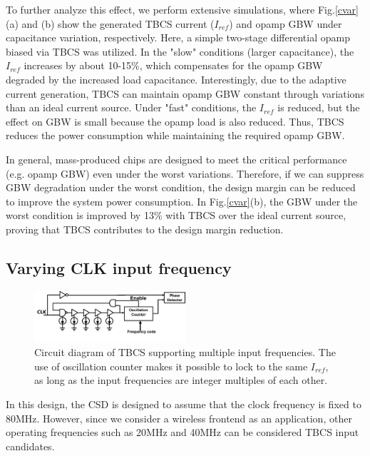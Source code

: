 \documentclass[paper]{ieice}
\begin{document}
To further analyze this effect, we perform extensive simulations, where Fig.\ref{cvar}(a) and (b) show the generated TBCS current ($I_{ref}$) and opamp GBW under capacitance variation, respectively. Here, a simple two-stage differential opamp biased via TBCS was utilized. In the "slow" conditions (larger capacitance), the $I_{ref}$ increases by about 10-15\%, which compensates for the opamp GBW degraded by the increased load capacitance. Interestingly, due to the adaptive current generation, TBCS can maintain opamp GBW constant through variations than an ideal current source. Under "fast" conditions, the $I_{ref}$ is reduced, but the effect on GBW is small because the opamp load is also reduced. Thus, TBCS reduces the power consumption while maintaining the required opamp GBW. 

In general, mass-produced chips are designed to meet the critical performance (e.g. opamp GBW) even under the worst variations. Therefore, if we can suppress GBW degradation under the worst condition, the design margin can be reduced to improve the system power consumption. In Fig.\ref{cvar}(b), the GBW under the worst condition is improved by 13\% with TBCS over the ideal current source, proving that TBCS contributes to the design margin reduction.

\subsection{Varying CLK input frequency}
\begin{figure}[!t]
\centering
 \includegraphics[width=0.5\textwidth]{figs/osc_tbcs.png}
  \caption{Circuit diagram of TBCS supporting multiple input frequencies. The use of oscillation  counter makes it possible to lock to the same $I_{ref}$, as long as the input frequencies are integer multiples of each other.}
\label{counter}
\end{figure}

\qquad In this design, the CSD is designed to assume that the clock frequency is fixed to 80MHz. However, since we consider a wireless frontend as an application, other operating frequencies such as 20MHz and 40MHz can be considered TBCS input candidates. %
\end{document}
